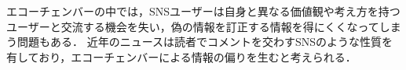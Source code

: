 \documentclass[12pt,a4j]{jreport}
\begin{document}
エコーチェンバーの中では，SNSユーザーは自身と異なる価値観や考え方を持つユーザーと交流する機会を失い，偽の情報を訂正する情報を得にくくなってしまう問題もある\cite{__2020-5}．
近年のニュースは読者でコメントを交わすSNSのような性質を有しており\cite{nagulendra_understanding_2014}，エコーチェンバーによる情報の偏りを生むと考えられる．


\end{document}
